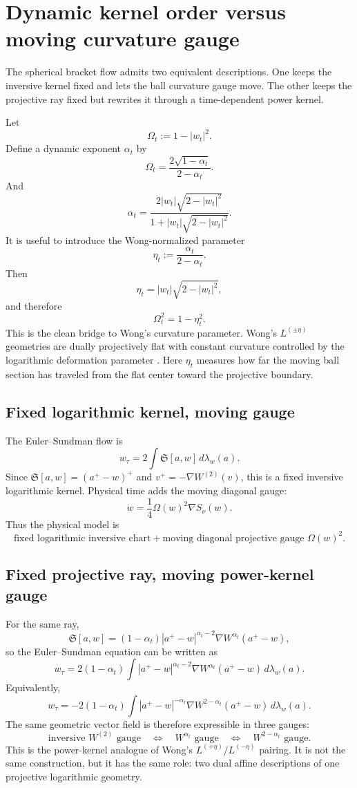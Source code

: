 \documentclass[11pt]{article}
\newcommand{\norm}[1]{\left|#1\right|}
\newcommand{\grad}{\nabla}
\newcommand{\Sbr}[2]{\mathfrak S[#1,#2]}
\newcommand{\Om}{\Omega}
\begin{document}
\section{Dynamic kernel order versus moving curvature gauge}

The spherical bracket flow admits two equivalent descriptions.  One keeps the inversive kernel fixed and lets the ball curvature gauge move.  The other keeps the projective ray fixed but rewrites it through a time-dependent power kernel.

Let
\[
    \Om_t:=1-\norm{w_t}^2.
\]
Define a dynamic exponent $\alpha_t$ by
\[
    \boxed{
    \Om_t=\frac{2\sqrt{1-\alpha_t}}{2-\alpha_t}.
    }
\]
And
\[
    \boxed{
    \alpha_t=\frac{2\norm{w_t}\sqrt{2-\norm{w_t}^2}}{1+\norm{w_t}\sqrt{2-\norm{w_t}^2}}.
    }
\]
It is useful to introduce the Wong-normalized parameter
\[
    \boxed{
    \eta_t:=\frac{\alpha_t}{2-\alpha_t}.
    }
\]
Then
\[
    \eta_t=\norm{w_t}\sqrt{2-\norm{w_t}^2},
\]
and therefore
\[
    \boxed{
    \Om_t^2=1-\eta_t^2.
    }
\]
This is the clean bridge to Wong's curvature parameter.  Wong's $L^{(\pm\eta)}$ geometries are dually projectively flat with constant curvature controlled by the logarithmic deformation parameter \cite{Wong2018}.  Here $\eta_t$ measures how far the moving ball section has traveled from the flat center toward the projective boundary.

\subsection{Fixed logarithmic kernel, moving gauge}

The Euler--Sundman flow is
\[
    w_\tau=2\int\Sbr{a}{w}\,d\lambda_w(a).
\]
Since $\Sbr{a}{w}=(a^+-w)^+$ and $v^+=-\grad W^{(2)}(v)$, this is a fixed inversive logarithmic kernel.  Physical time adds the moving diagonal gauge:
\[
    \dot w=\frac14\Om(w)^2\grad S_\nu(w).
\]
Thus the physical model is
\[
    \boxed{
    \text{fixed logarithmic inversive chart} + \text{moving diagonal projective gauge }\Om(w)^2.
    }
\]

\subsection{Fixed projective ray, moving power-kernel gauge}

For the same ray,
\[
    \Sbr{a}{w}=(1-\alpha_t)\norm{a^+-w}^{\alpha_t-2}\grad W^{\alpha_t}(a^+-w),
\]
so the Euler--Sundman equation can be written as
\[
    \boxed{
    w_\tau=2(1-\alpha_t)\int
    \norm{a^+-w}^{\alpha_t-2}\grad W^{\alpha_t}(a^+-w)\,d\lambda_w(a).
    }
\]
Equivalently,
\[
    \boxed{
    w_\tau=-2(1-\alpha_t)\int
    \norm{a^+-w}^{-\alpha_t}\grad W^{2-\alpha_t}(a^+-w)\,d\lambda_w(a).
    }
\]
The same geometric vector field is therefore expressible in three gauges:
\[
    \boxed{
    \text{inversive }W^{(2)}\text{ gauge}
    \quad\Longleftrightarrow\quad
    W^{\alpha_t}\text{ gauge}
    \quad\Longleftrightarrow\quad
    W^{2-\alpha_t}\text{ gauge}.
    }
\]
This is the power-kernel analogue of Wong's $L^{(+\eta)}$/$L^{(-\eta)}$ pairing.  It is not the same construction, but it has the same role: two dual affine descriptions of one projective logarithmic geometry.
\end{document}
